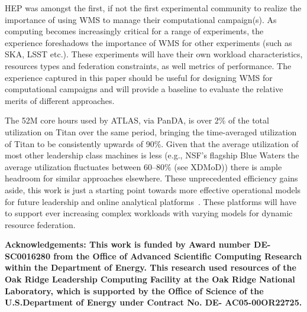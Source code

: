 
HEP was amongst the first, if not the first experimental community to realize
the importance of using WMS to manage their computational campaign(s). As
computing becomes increasingly critical for a range of experiments, the
experience foreshadows the importance of WMS for other experiments (such as
SKA, LSST etc.).  These experiments will have their own workload
characteristics, resources types and federation constraints, as well metrics
of performance. The experience captured in this paper should be useful
for designing WMS for computational campaigns and will provide a baseline to
evaluate the relative merits of different approaches.

The 52M core hours used by ATLAS, via PanDA, is over 2\% of the total
utilization on Titan over the same period, bringing the time-averaged
utilization of Titan to be consistently upwards of 90\%. Given that the
average utilization of most other leadership class machines is less (e.g.,
NSF's flagship Blue Waters the average utilization fluctuates between
60--80\% (see XDMoD\cite{bw-sucks})) there is ample headroom for similar
approaches elsewhere. These unprecedented efficiency gains aside, this work
is just a starting point towards more effective operational models for future
leadership and online analytical platforms~\cite{foap-url}. These platforms
will have to support ever increasing complex workloads with varying models
for dynamic resource federation.

{\bf \footnotesize Acknowledgements: This work is funded by Award number DE-
SC0016280 from the Office of Advanced Scientific Computing Research within the
Department of Energy. This research used resources of the Oak Ridge Leadership
Computing Facility at the Oak Ridge National Laboratory, which is supported by
the Office of Science of the U.S.Department of Energy under Contract No. DE-
AC05-00OR22725. \par}


